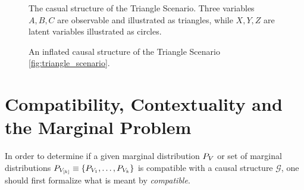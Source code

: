 \documentclass[aps, 10pt, english, twoside, pra, nofootinbib, longbibliography]{revtex4-1}
\theoremstyle{plain}
\theoremstyle{definition}
\theoremstyle{remark}
\newcommand{\graph}{\mathcal{G}}
\begin{document}
    \begin{figure}
    \begin{center}
        \begin{minipage}[b]{.48\textwidth}
            \centering
            \scalebox{1.0}{}
            \caption{The casual structure of the Triangle Scenario. Three variables $A,B,C$ are observable and illustrated as triangles, while $X, Y, Z$ are latent variables illustrated as circles.}
            \label{fig:triangle_scenario}
        \end{minipage}\hspace{0.04\textwidth}%
        \begin{minipage}[b]{.48\textwidth}
            \centering
            \scalebox{0.8}{}
            \caption{An inflated causal structure of the Triangle Scenario \cref{fig:triangle_scenario}.}
            \label{fig:inflated_triangle_scenario}
        \end{minipage}
    \end{center}
    \end{figure}

    \section{Compatibility, Contextuality and the Marginal Problem}
    \label{sec:comp_con_mp}
    In order to determine if a given marginal distribution $\prob[V]$ or set of marginal distributions $\prob[V_{\bs{k}}] \defined \bc{\prob[V_1], \ldots, \prob[V_k]}$ is compatible with a causal structure $\graph$, one should first formalize what is meant by \textit{compatible}.
\end{document}
